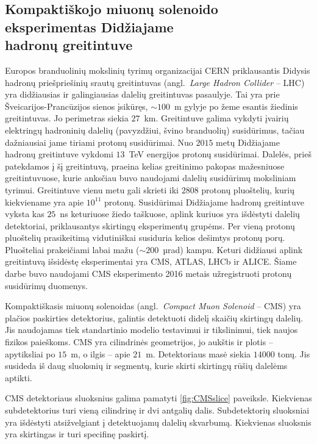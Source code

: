 \documentclass[a4paper, 12pt, oneside]{article}
\begin{document}
\subsection{Kompaktiškojo miuonų solenoido eksperimentas Didžiajame\\ hadronų greitintuve}
Europos branduolinių mokslinių tyrimų organizacijai CERN priklausantis Didysis hadronų priešpriešinių srautų
greitintuvas (angl.\ \textit{Large Hadron Collider} -- LHC) \cite{LHC} yra didžiausias ir galingiausias dalelių greitintuvas pasaulyje.
Tai yra prie Šveicarijos-Prancūzijos sienos įsikūręs, $\sim\!\!100$~m gylyje po žeme esantis žiedinis greitintuvas.
Jo perimetras siekia $27$~km.
Greitintuve galima vykdyti įvairių elektringų hadroninių dalelių (pavyzdžiui, švino branduolių) susidūrimus, tačiau dažniausiai jame
tiriami protonų susidūrimai.
Nuo $2015$ metų Didžiajame hadronų greitintuve vykdomi $13$~TeV energijos protonų susidūrimai.
Dalelės, prieš patekdamos į šį greitintuvą, praeina kelias greitinimo pakopas mažesniuose greitintuvuose, kurie anksčiau buvo
naudojami dalelių susidūrimų moksliniam tyrimui.
Greitintuve vienu metu gali skrieti iki $2808$ protonų pluoštelių, kurių kiekviename yra apie $10^{11}$ protonų.
Susidūrimai Didžiajame hadronų greitintuve vyksta kas $25$~ns keturiuose žiedo taškuose, aplink kuriuos yra išdėstyti dalelių
detektoriai, priklausantys skirtingų eksperimentų grupėms.
Per vieną protonų pluoštelių prasikeitimą vidutiniškai susiduria kelios dešimtys protonų porų.
Pluošteliai prakeičiami labai mažu ($\sim\!\!200$~µrad) kampu.
Keturi didžiausi aplink greitintuvą išsidėstę eksperimentai yra CMS, ATLAS, LHCb ir ALICE.
Šiame darbe buvo naudojami CMS eksperimento 2016 metais užregistruoti protonų susidūrimų duomenys.

Kompaktiškasis miuonų solenoidas (angl.\ \textit{Compact Muon Solenoid} -- CMS) \cite{CMSexperiment}
yra plačios paskirties detektorius, galintis detektuoti didelį skaičių skirtingų dalelių.
Jis naudojamas tiek standartinio modelio testavimui ir tikslinimui, tiek naujos fizikos paieškoms.
CMS yra cilindrinės geometrijos, jo aukštis ir plotis -- apytiksliai po $15$~m, o ilgis --
apie $21$~m.
Detektoriaus masė siekia $14000$ tonų.
Jis susideda iš daug sluoksnių ir segmentų, kurie skirti
skirtingų rūšių dalelėms aptikti.

CMS detektoriaus sluoksnius galima pamatyti \ref{fig:CMSslice} paveiksle.
Kiekvienas subdetektorius turi vieną cilindrinę ir dvi antgalių dalis.
Subdetektorių sluoksniai yra išdėstyti atsižvelgiant į detektuojamų dalelių skvarbumą.
Kiekvienas sluoksnis yra skirtingas ir turi specifinę paskirtį.
\end{document}

